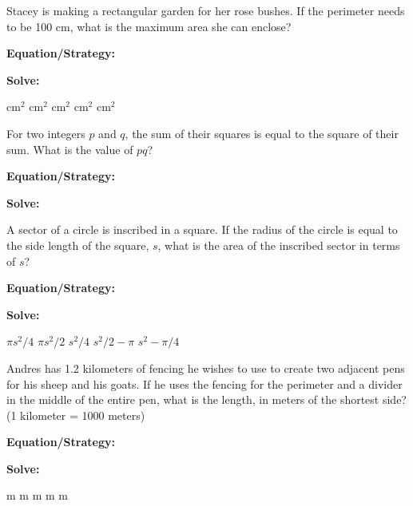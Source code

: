 \vfill
\newpage
\begin{multicols}{2}
\begin{outline}[enumerate]
\medium

\1 Stacey is making a rectangular garden for her rose bushes. If the perimeter needs to be 100 cm, what is the maximum area she can enclose?

\bigskip
\textbf{Equation/Strategy:} \hrulefill

\bigskip
\textbf{Solve:}

\vfill
{} cm$^2$
 cm$^2$
 cm$^2$
 cm$^2$
 cm$^2$

\midline

\1 For two integers $p$ and $q$, the sum of their squares is equal to the square of their sum. What is the value of $pq$?

\bigskip
\textbf{Equation/Strategy:} \hrulefill

\bigskip
\textbf{Solve:}

\vfill
{}

\columnbreak
\advanced

\1 A sector of a circle is inscribed in a square. If the radius of the circle is equal to the side length of the square, $s$, what is the area of the inscribed sector in terms of $s$?

\bigskip
\textbf{Equation/Strategy:} \hrulefill

\bigskip
\textbf{Solve:}

\vfill
\2 $\pi s^2/4$
\2 $\pi s^2/2$
\2 $s^2/4$
\2 $s^2/2-\pi$
\2 $s^2-\pi/4$

\midline

\1 Andres has 1.2 kilometers of fencing he wishes to use to create two adjacent pens for his sheep and his goats. If he uses the fencing for the perimeter and a divider in the middle of the entire pen, what is the length, in meters of the shortest side? (1 kilometer = 1000 meters)

\bigskip
\textbf{Equation/Strategy:} \hrulefill

\bigskip
\textbf{Solve:}

\vfill
{} m
 m
 m
 m
 m
\end{outline}
\end{multicols}